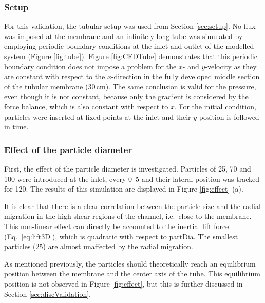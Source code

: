 \subsubsection{Setup}
For this validation, the tubular setup was used from Section \ref{sec:setup}. No flux was imposed at the membrane and an infinitely long tube was simulated by employing periodic boundary conditions at the inlet and outlet of the modelled system (Figure \ref{fig:tube}). Figure \ref{fig:CFDTube} demonstrates that this periodic boundary condition does not impose a problem for the $x$- and $y$-velocity as they are constant with respect to the $x$-direction in the fully developed middle section of the tubular membrane (30\,cm). The same conclusion is valid for the pressure, even though it is not constant, because only the gradient is considered by the force balance, which is also constant with respect to $x$. For the initial condition, particles were inserted at fixed points at the inlet and their $y$-position is followed in time.
\subsubsection{Effect of the particle diameter \label{sec:effectOfDiameter}}
First, the effect of the particle diameter is investigated. Particles of \unit{25}{\micro\metre}, \unit{70}{\micro\metre} and \unit{100}{\micro\metre} were introduced at the inlet, every \unit{0.5}{\milli\metre} and their lateral position was tracked for \unit{120}{\second}. The results of this simulation are displayed in Figure \ref{fig:effect} (a). \par 

It is clear that there is a clear correlation between the particle size and the radial migration in the high-shear regions of the channel, i.e.\ close to the membrane. This non-linear effect can directly be accounted to the inertial lift force  (Eq.\ \eqref{eq:lift3D}), which is quadratic with respect to \gls{partDia}. The smallest particles (\unit{25}{\micro\metre}) are almost unaffected by the radial migration. \par
As mentioned previously, the particles should theoretically reach an equilibrium position between the membrane and the center axis of the tube. This equilibrium position is not observed in Figure \ref{fig:effect}, but this is further discussed in Section \ref{sec:discValidation}.

